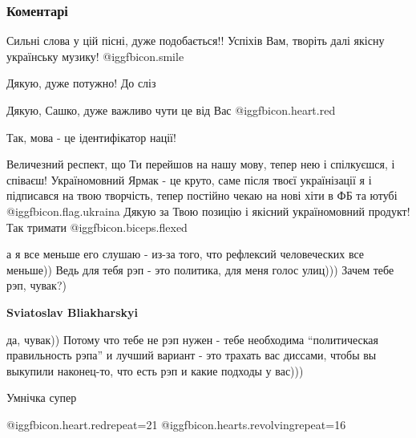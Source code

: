  
 
 
 
 
\subsubsection{Коментарі}
\label{sec:09_11_2021.fb.jarmak.1.govorit_ridnoju.cmt}

\begin{itemize} %
Сильні слова у цій пісні, дуже подобається!! Успіхів Вам, творіть далі якісну українську музику! @igg{fbicon.smile} 

Дякую, дуже потужно! До сліз

Дякую, Сашко, дуже важливо чути це від Вас @igg{fbicon.heart.red}


Так, мова - це ідентифікатор нації!

Величезний респект, що Ти перейшов на нашу мову, тепер нею і спілкуєшся, і
співаєш! Україномовний Ярмак - це круто, саме після твоєї українізації я і
підписався на твою творчість, тепер постійно чекаю на нові хіти в ФБ та ютубі
@igg{fbicon.flag.ukraina} Дякую за Твою позицію і якісний україномовний
продукт! Так тримати  @igg{fbicon.biceps.flexed} 

\begin{itemize} %

а я все меньше его слушаю - из-за того, что рефлексий человеческих все меньше))
Ведь для тебя рэп - это политика, для меня голос улиц))) Зачем тебе рэп,
чувак?)

\textbf{Sviatoslav Bliakharskyi} 

да, чувак)) Потому что тебе не рэп нужен - тебе необходима \enquote{политическая
правильность рэпа} и лучший вариант - это трахать вас диссами, чтобы вы
выкупили наконец-то, что есть рэп и какие подходы у вас)))

\end{itemize} %

Умнічка супер

@igg{fbicon.heart.red}{repeat=21} 
@igg{fbicon.hearts.revolving}{repeat=16} 


\end{itemize}
